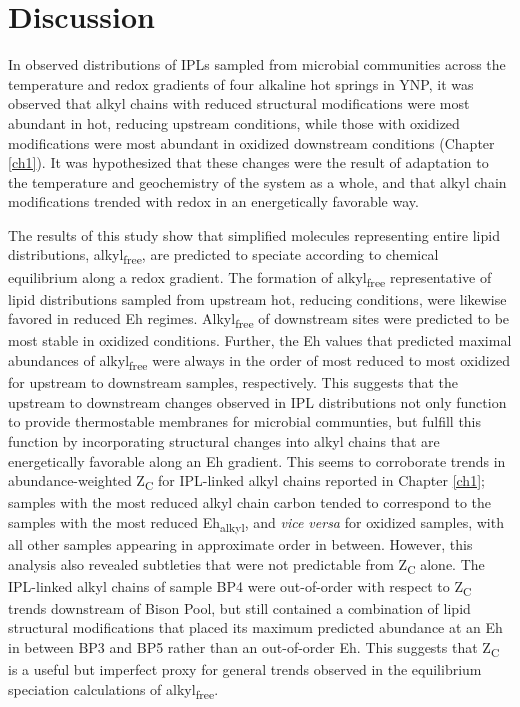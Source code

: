 \section{Discussion}

In observed distributions of IPLs sampled from microbial communities across the temperature and redox gradients of four alkaline hot springs in YNP, it was observed that alkyl chains with reduced structural modifications were most abundant in hot, reducing upstream conditions, while those with oxidized modifications were most abundant in oxidized downstream conditions (Chapter \ref{ch1}). It was hypothesized that these changes were the result of adaptation to the temperature and geochemistry of the system as a whole, and that alkyl chain modifications trended with redox in an energetically favorable way.

The results of this study show that simplified molecules representing entire lipid distributions, alkyl\textsubscript{free}, are predicted to speciate according to chemical equilibrium along a redox gradient. The formation of alkyl\textsubscript{free} representative of lipid distributions sampled from upstream hot, reducing conditions, were likewise favored in reduced Eh regimes. Alkyl\textsubscript{free} of downstream sites were predicted to be most stable in oxidized conditions. Further, the Eh values that predicted maximal abundances of alkyl\textsubscript{free} were always in the order of most reduced to most oxidized for upstream to downstream samples, respectively. This suggests that the upstream to downstream changes observed in IPL distributions not only function to provide thermostable membranes for microbial communties, but fulfill this function by incorporating structural changes into alkyl chains that are energetically favorable along an Eh gradient. This seems to corroborate trends in abundance-weighted Z\textsubscript{C} for IPL-linked alkyl chains reported in Chapter \ref{ch1}; samples with the most reduced alkyl chain carbon tended to correspond to the samples with the most reduced Eh\textsubscript{alkyl}, and \textit{vice versa} for oxidized samples, with all other samples appearing in approximate order in between. However, this analysis also revealed subtleties that were not predictable from Z\textsubscript{C} alone. The IPL-linked alkyl chains of sample BP4 were out-of-order with respect to Z\textsubscript{C} trends downstream of Bison Pool, but still contained a combination of lipid structural modifications that placed its maximum predicted abundance at an Eh in between BP3 and BP5 rather than an out-of-order Eh. This suggests that Z\textsubscript{C} is a useful but imperfect proxy for general trends observed in the equilibrium speciation calculations of alkyl\textsubscript{free}.


